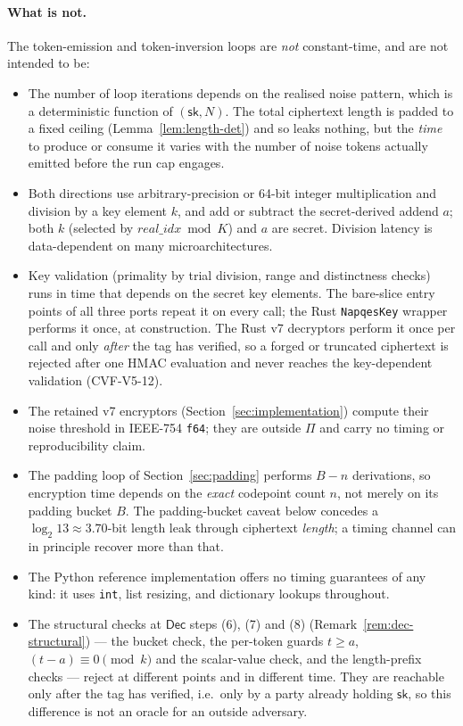 \documentclass[11pt,a4paper]{article}
\begin{document}
\paragraph{What is not.} The token-emission and token-inversion loops are
\emph{not} constant-time, and are not intended to be:
\begin{itemize}
  \item The number of loop iterations depends on the realised noise
        pattern, which is a deterministic function of $(\mathsf{sk},N)$.
        The total ciphertext length is padded to a fixed ceiling
        (Lemma~\ref{lem:length-det}) and so leaks nothing, but the
        \emph{time} to produce or consume it varies with the number of
        noise tokens actually emitted before the run cap engages.
  \item Both directions use arbitrary-precision or 64-bit integer
        multiplication and division by a key element $k$, and add or
        subtract the secret-derived addend $a$; both $k$ (selected by
        $real\_idx \bmod K$) and $a$ are secret. Division latency
        is data-dependent on many microarchitectures.
  \item Key validation (primality by trial division, range and
        distinctness checks) runs in time that depends on the secret key
        elements. The bare-slice entry points of all three ports repeat it
        on every call; the Rust \texttt{NapqesKey} wrapper performs it once,
        at construction. The Rust v7 decryptors perform it once per call and
        only \emph{after} the tag has verified, so a forged or truncated
        ciphertext is rejected after one HMAC evaluation and never reaches
        the key-dependent validation (CVF-V5-12).
  \item The retained v7 encryptors (Section~\ref{sec:implementation})
        compute their noise threshold in IEEE-754 \texttt{f64}; they are
        outside $\Pi$ and carry no timing or reproducibility claim.
  \item The padding loop of Section~\ref{sec:padding} performs $B-n$
        derivations, so encryption time depends on the \emph{exact}
        codepoint count $n$, not merely on its padding bucket $B$. The
        padding-bucket caveat below concedes a $\log_2 13\approx3.70$-bit
        length leak through ciphertext \emph{length}; a timing channel can
        in principle recover more than that.
  \item The Python reference implementation offers no timing guarantees of
        any kind: it uses \texttt{int}, list resizing, and dictionary
        lookups throughout.
  \item The structural checks at $\mathsf{Dec}$ steps (6), (7) and (8)
        (Remark~\ref{rem:dec-structural}) — the bucket check, the per-token
        guards $t\ge a$, $(t-a)\equiv0\pmod k$ and the scalar-value check,
        and the length-prefix checks — reject at different points and in
        different time. They are reachable only after the tag has verified,
        i.e.\ only by a party already holding $\mathsf{sk}$, so this
        difference is not an oracle for an outside adversary.
\end{itemize}
\end{document}
